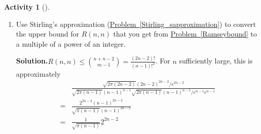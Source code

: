 \documentclass[10pt,]{book}
\theoremstyle{plain}
\theoremstyle{definition}
\newtheorem{activity}[project]{Activity}
\numberwithin{equation}{chapter}
\newcommand{\amp}{&}
\begin{document}
\begin{activity}[]
\begin{enumerate}[label=(\alph*)]
~\par
\item Use Stirling's approximation (\hyperref[Stirling_sapproximation]{Problem~\ref{Stirling_sapproximation}}) to convert the upper bound for \(R(n,n)\) that you get from \hyperref[Ramseybound]{Problem~\ref{Ramseybound}} to a multiple of a power of an integer.%
\par\medskip\noindent%
\textbf{Solution.}\quad \(R(n,n)\le \binom{n+n-2}{m-1}=\frac{(2n-2)!}{(n-1)!^2}\). For \(n\) sufficiently large, this is approximately%
\begin{align*}
\amp \frac{\sqrt{2\pi (2n-2)}(2n-2)^{2n-2}/e^{2n-2}}{ \sqrt{2 \pi (n-1)}(n-1)^{n-1}\sqrt{2 \pi
(n-1)}(n-1)^{n-1}/e^{n-1}e^{n-1}}\\
=\amp \frac{2^{2n-2}(n-1)^{2n-2}}{\sqrt{\pi
(n-1)}(n-1)^{2n-2}}\\
=\amp \frac{1}{\sqrt{\pi
(n-1)}}2^{2n-2}
\end{align*}
%

\end{enumerate}
\end{activity}
\typeout{************************************************}
\typeout{************************************************}
\end{document}
